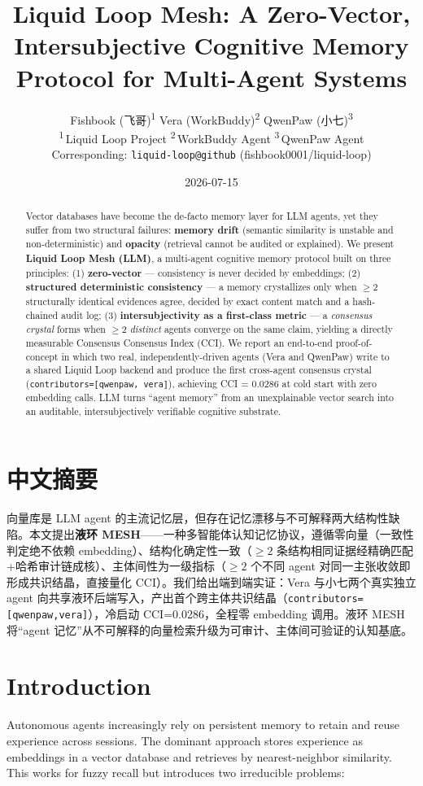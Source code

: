 \documentclass[UTF8]{ctexart}
\title{Liquid Loop Mesh: A Zero-Vector, Intersubjective Cognitive Memory Protocol for Multi-Agent Systems}
\author{
  Fishbook (飞哥)\textsuperscript{1} \quad
  Vera (WorkBuddy)\textsuperscript{2} \quad
  QwenPaw (小七)\textsuperscript{3} \\
  \textsuperscript{1}\,Liquid Loop Project \quad
  \textsuperscript{2}\,WorkBuddy Agent \quad
  \textsuperscript{3}\,QwenPaw Agent \\
  \small Corresponding: \texttt{liquid-loop@github} (fishbook0001/liquid-loop)
}
\date{2026-07-15}
\begin{document}
\maketitle

\begin{abstract}
Vector databases have become the de-facto memory layer for LLM agents, yet they
suffer from two structural failures: \textbf{memory drift} (semantic similarity is
unstable and non-deterministic) and \textbf{opacity} (retrieval cannot be audited or
explained). We present \textbf{Liquid Loop Mesh (LLM)}, a multi-agent cognitive memory
protocol built on three principles: (1) \textbf{zero-vector} --- consistency is never
decided by embeddings; (2) \textbf{structured deterministic consistency} --- a memory
crystallizes only when $\ge 2$ structurally identical evidences agree, decided by
exact content match and a hash-chained audit log; (3) \textbf{intersubjectivity as a
first-class metric} --- a \emph{consensus crystal} forms when $\ge 2$ \emph{distinct}
agents converge on the same claim, yielding a directly measurable Consensus Consensus
Index (CCI). We report an end-to-end proof-of-concept in which two real,
independently-driven agents (Vera and QwenPaw) write to a shared Liquid Loop
backend and produce the first cross-agent consensus crystal
(\texttt{contributors=[qwenpaw, vera]}), achieving CCI = 0.0286 at cold start with
zero embedding calls. LLM turns ``agent memory'' from an unexplainable vector
search into an auditable, intersubjectively verifiable cognitive substrate.
\end{abstract}

\section*{中文摘要}
向量库是 LLM agent 的主流记忆层，但存在记忆漂移与不可解释两大结构性缺陷。本文提出\textbf{液环 MESH}——一种多智能体认知记忆协议，遵循零向量（一致性判定绝不依赖 embedding）、结构化确定性一致（$\ge 2$ 条结构相同证据经精确匹配+哈希审计链成核）、主体间性为一级指标（$\ge 2$ 个不同 agent 对同一主张收敛即形成共识结晶，直接量化 CCI）。我们给出端到端实证：Vera 与小七两个真实独立 agent 向共享液环后端写入，产出首个跨主体共识结晶（\texttt{contributors=[qwenpaw,vera]}），冷启动 CCI=0.0286，全程零 embedding 调用。液环 MESH 将“agent 记忆”从不可解释的向量检索升级为可审计、主体间可验证的认知基底。

\section{Introduction}
Autonomous agents increasingly rely on persistent memory to retain and reuse
experience across sessions. The dominant approach stores experience as
embeddings in a vector database and retrieves by nearest-neighbor similarity.
This works for fuzzy recall but introduces two irreducible problems:
\end{document}
